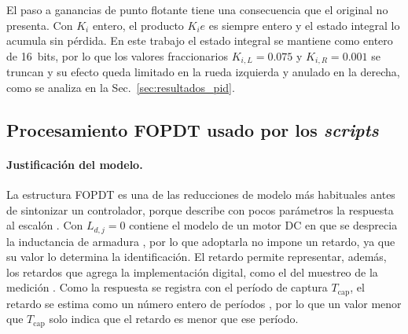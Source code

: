 \begin{appendices}
El paso a ganancias de punto flotante tiene una consecuencia que el original
no presenta. Con $K_i$ entero, el producto $K_i e$ es siempre entero y el
estado integral lo acumula sin pérdida. En este trabajo el estado integral se
mantiene como entero de 16~bits, por lo que los valores fraccionarios
$K_{i,L}=0.075$ y $K_{i,R}=0.001$ se truncan y su efecto queda limitado en la
rueda izquierda y anulado en la derecha, como se analiza en la
Sec.~\ref{sec:resultados_pid}.

\subsection{Procesamiento FOPDT usado por los \texorpdfstring{\textit{scripts}}{scripts}}
\label{anx:fodt_scripts}

\paragraph{Justificación del modelo.} La estructura FOPDT es una de las
reducciones de modelo más habituales antes de sintonizar un controlador, porque
describe con pocos parámetros la respuesta al escalón \citep{maxim2023fopdt}.
Con $L_{d,j}=0$ contiene el modelo de un motor DC en que se desprecia la
inductancia de armadura \citep{iqbal2023electromechanical}, por lo que
adoptarla no impone un retardo, ya que su valor lo determina la identificación.
El retardo permite representar, además, los retardos que agrega la
implementación digital, como el del muestreo de la medición
\citep[Sec.~13.3]{astrom2009controlpid}. Como la respuesta se registra con el
período de captura $T_{\mathrm{cap}}$, el retardo se estima como un número
entero de períodos \citep[Sec.~2.4]{maxim2023fopdt}, por lo que un valor menor
que $T_{\mathrm{cap}}$ solo indica que el retardo es menor que ese período.


\end{appendices}
